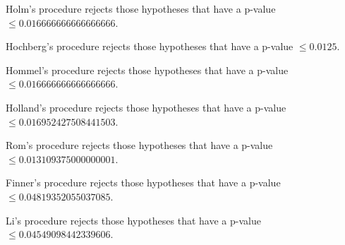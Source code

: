 \documentclass[a4paper,10pt]{article}
\begin{document}
\begin{landscape}
Holm's procedure rejects those hypotheses that have a p-value $\le0.016666666666666666$.


Hochberg's procedure rejects those hypotheses that have a p-value $\le0.0125$.


Hommel's procedure rejects those hypotheses that have a p-value $\le0.016666666666666666$.


Holland's procedure rejects those hypotheses that have a p-value $\le0.016952427508441503$.


Rom's procedure rejects those hypotheses that have a p-value $\le0.013109375000000001$.


Finner's procedure rejects those hypotheses that have a p-value $\le0.04819352055037085$.


Li's procedure rejects those hypotheses that have a p-value $\le0.04549098442339606$.



\newpage


\end{landscape}
\end{document}

